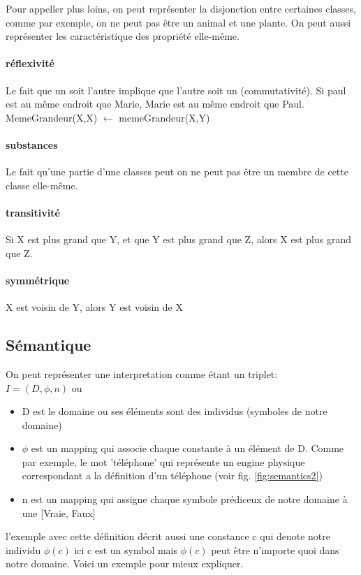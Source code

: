 \documentclass[oneside]{book}
\begin{document}
Pour appeller plus loins, on peut représenter la disjonction entre certaines classes, comme par exemple, on ne peut pas être un animal et une plante. On peut aussi représenter les caractéristique des propriété elle-même.

\paragraph{réflexivité}
Le fait que un soit l'autre implique que l'autre soit un (commutativité). Si paul est au même endroit que Marie, Marie est au même endroit que Paul. \\

MemeGrandeur(X,X) $\leftarrow$ memeGrandeur(X,Y)

\paragraph{substances}
Le fait qu'une partie d'une classes peut on ne peut pas être un membre de cette classe elle-même.

\paragraph{transitivité}
Si X est plus grand que Y, et que Y est plus grand que Z, alors X est plus grand que Z.

\paragraph{symmétrique}
X est voisin de Y, alors Y est voisin de X\\

\subsection{Sémantique}
On peut représenter une interpretation comme étant un triplet:\\

$I = (D,\phi, n)$ ou \\
\begin{itemize}
\item D est le domaine ou ses éléments sont des individus (symboles de notre domaine)
\item $\phi$ est un mapping qui associe chaque constante à un élément de D. Comme par exemple, le mot 'téléphone' qui représente un engine physique correspondant a la définition d'un téléphone (voir fig. \ref{fig:semantics2})
\item n est un mapping qui assigne chaque symbole prédiceux de notre domaine à une [Vraie, Faux]
\end{itemize}
l'exemple avec cette définition décrit aussi une constance c qui denote notre individu $\phi(c)$ ici c est un symbol mais $\phi(c)$ peut être n'importe quoi dans notre domaine. Voici un exemple pour mieux expliquer.
\end{document}
